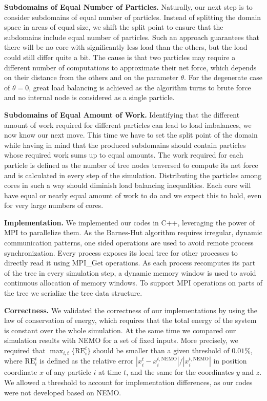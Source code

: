 \documentclass[letterpaper]{article}
\newcommand{\mypar}[1]{{\bf #1.}}
\begin{document}
\mypar{Subdomains of Equal Number of Particles} Naturally, our next step is to consider subdomains of equal number of particles. Instead of splitting the domain space in areas of equal size, we shift the split point to ensure that the subdomains include equal number of particles. \newline
\indent Such an approach guarantees that there will be no core with significantly less load than the others, but the load could still differ quite a bit. The cause is that two particles may require a different number of computations to approximate their net force, which depends on their distance from the others and on the parameter $\theta$. For the degenerate case of $\theta = 0$, great load balancing is achieved as the algorithm turns to brute force and no internal node is considered as a single particle.

\mypar{Subdomains of Equal Amount of Work} Identifying that the different amount of work required for different particles can lead to load imbalances, we now know our next move. This time we have to set the split point of the domain while having in mind that the produced subdomains should contain particles whose required work sums up to equal amounts. The work required for each particle is defined as the number of tree nodes traversed to compute its net force and is calculated in every step of the simulation. \newline
\indent Distributing the particles among cores in such a way should diminish load balancing inequalities. Each core will have equal or nearly equal amount of work to do and we expect this to hold, even for very large numbers of cores. 

\mypar{Implementation} We implemented our codes in C++, leveraging the power of MPI to parallelize them. As the Barnes-Hut algorithm requires irregular, dynamic communication patterns, one sided operations are used to avoid remote process synchronization. Every process exposes its local tree for other processes to directly read it using MPI\_Get operations. As each process recomputes its part of the tree in every simulation step, a dynamic memory window is used to avoid continuous allocation of memory windows. To support MPI operations on parts of the tree we serialize the tree data structure.

\mypar{Correctness} We validated the correctness of our implementations by using the law of conservation of energy, which requires that the total energy of the system is constant over the whole simulation. At the same time we compared our simulation results with NEMO \cite{nemo} for a set of fixed inputs. More precisely, we required that $\max_{i,t} \{\text{RE}_i^t\}$ should be smaller than a given threshold of $0.01 \%$, where $\text{RE}_i^t$ is defined as the relative error $|x_i^t - x_i^{t,\text{NEMO}}|/ |x_i^{t,\text{NEMO}}| $ in position coordinate $x$ of any particle $i$ at time $t$, and the same for the coordinates $y$ and $z$. We allowed a threshold to account for implementation differences, as our codes were not developed based on NEMO.
\end{document}

